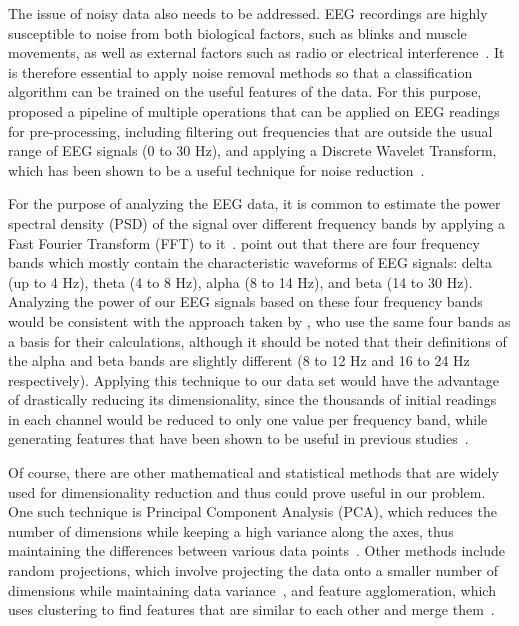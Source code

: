 \documentclass{mprop}
\begin{document}
The issue of noisy data also needs to be addressed. EEG recordings are highly susceptible to noise from both biological factors, such as blinks and muscle movements, as well as external factors such as radio or electrical interference~\cite{fitzgibbon_removal_2007}. It is therefore essential to apply noise removal methods so that a classification algorithm can be trained on the useful features of the data. For this purpose, \citet{shaker_eeg_2007} proposed a pipeline of multiple operations that can be applied on EEG readings for pre-processing, including filtering out frequencies that are outside the usual range of EEG signals (0 to 30 Hz), and applying a Discrete Wavelet Transform, which has been shown to be a useful technique for noise reduction~\cite{lang_noise_1996,lang_nonlinear_1995}.

For the purpose of analyzing the EEG data, it is common to estimate the power spectral density (PSD) of the signal over different frequency bands by applying a Fast Fourier Transform (FFT) to it~\cite{al-fahoum_methods_2014}. \citet{subasi_neural_2005} point out that there are four frequency bands which mostly contain the characteristic waveforms of EEG signals: delta (up to 4 Hz), theta (4 to 8 Hz), alpha (8 to 14  Hz), and beta (14 to 30  Hz). Analyzing the power of our EEG signals based on these four frequency bands would be consistent with the approach taken by \citet{vuckovic_dynamic_2014}, who use the same four bands as a basis for their calculations, although it should be noted that their definitions of the alpha and beta bands are slightly different (8 to 12 Hz and 16 to 24 Hz respectively). Applying this technique to our data set would have the advantage of drastically reducing its dimensionality, since the thousands of initial readings in each channel would be reduced to only one value per frequency band, while generating features that have been shown to be useful in previous studies~\cite{jarjees_causality_nodate,vuckovic_dynamic_2014,vuckovic_prediction_2018}.

Of course, there are other mathematical and statistical methods that are widely used for dimensionality reduction and thus could prove useful in our problem. One such technique is Principal Component Analysis (PCA), which reduces the number of dimensions while keeping a high variance along the axes, thus maintaining the differences between various data points~\cite{wold_principal_1987,kumar_understanding_2018}. Other methods include random projections, which involve projecting the data onto a smaller number of dimensions while maintaining data variance~\cite{bingham_random_2001}, and feature agglomeration, which uses clustering to find features that are similar to each other and merge them~\cite{wang_towards_2018}.
\end{document}
